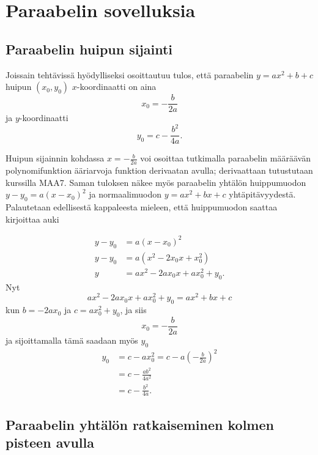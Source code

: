 \section{Paraabelin sovelluksia}


\subsection{Paraabelin huipun sijainti}
Joissain tehtävissä hyödylliseksi osoittautuu tulos, että paraabelin $y = ax^2 +b +c$ huipun $(x_0, y_0)$ $x$-koordinaatti on aina
\[x_0 = - \frac{b}{2a}\]
ja $y$-koordinaatti
\[y_0 = c - \frac{b^2}{4a}.\]


Huipun sijainnin kohdassa $x = - \frac{b}{2a}$ voi osoittaa tutkimalla paraabelin määräävän polynomifunktion ääriarvoja funktion derivaatan avulla; derivaattaan tutustutaan kurssilla MAA7. Saman tuloksen näkee myös paraabelin yhtälön huippumuodon $y - y_0 = a(x- x_0)^2$ ja normaalimuodon $y = ax^2 +bx +c$ yhtäpitävyydestä. Palautetaan edellisestä kappaleesta mieleen, että huippumuodon saattaa kirjoittaa auki

\begin{align*}
y-y_0 &= a(x-x_0)^2 \\
y-y_0 &= a(x^2 - 2x_0x + x_0^2) \\
y &= ax^2 - 2ax_0 x + ax_0^2 +y_0.
\end{align*}
Nyt
\[ax^2 - 2ax_0 x + ax_0^2 +y_0 = ax^2 +bx +c\]
kun $b = -2ax_0$ ja $c = ax_0^2 +y_0$, ja siis
\[x_0 = -\frac{b}{2a}\]
ja sijoittamalla tämä saadaan myös $y_0$
\begin{align*}
y_0 &= c - ax_0^2 = c -a\left(-\frac{b}{2a}\right)^2 \\
&= c - \frac{ab^2}{4a^2} \\
&= c - \frac{b^2}{4a}.
\end{align*}

\subsection{Paraabelin yhtälön ratkaiseminen kolmen pisteen avulla}

